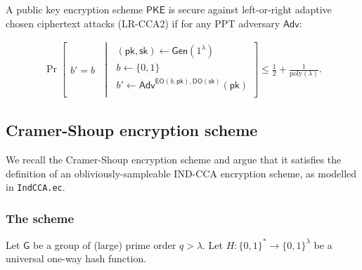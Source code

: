 \documentclass[11pt,letterpaper]{article}
\theoremstyle{plain} %
\theoremstyle{definition} %
\theoremstyle{remark} %
\newcommand{\code}[1]{\texttt{#1}} %
\newcommand{\SecParam}{\lambda}
\newcommand{\PKE}{\mathsf{PKE}}
\newcommand{\Gen}{\mathsf{Gen}}
\newcommand{\EncKey}{\mathsf{pk}}
\newcommand{\DecKey}{\mathsf{sk}}
\newcommand{\GuessBit}{b'}
\newcommand{\ChallengerBit}{b}
\newcommand{\EncOracle}{\mathsf{EO}}
\newcommand{\DecOracle}{\mathsf{DO}}
\newcommand{\Adversary}{{\mathsf{Adv}}} %
\newcommand{\pST}{\; \middle| \;}
\newcommand{\poly}{\mathrm{poly}}
\newcommand{\Bits}{\{0,1\}}
\newcommand{\Group}{\mathsf{G}}
\newcommand{\GrpOrd}{q}
\newcommand{\Hash}{H}
\begin{document}
A public key encryption scheme $\PKE$ is secure against left-or-right adaptive chosen ciphertext attacks (LR-CCA2) if for any PPT adversary $\Adversary$:

\begin{align*}
	\Pr \left[
	\begin{array}{c}
		\GuessBit = \ChallengerBit
	\end{array}
	\pST
	\begin{array}{r}
		(\EncKey, \DecKey) \gets \Gen(1^{\SecParam})\\
		\ChallengerBit \gets \Bits\\
		\GuessBit \gets \Adversary^{\EncOracle(\ChallengerBit,\EncKey), \DecOracle(\DecKey)}(\EncKey)\\
	\end{array}
	\right] \leq \frac{1}{2} + \frac{1}{\poly(\SecParam)}.
\end{align*}

\subsection{Cramer-Shoup encryption scheme}
\label{sec:cramer-shoup}
We recall the Cramer-Shoup encryption scheme \cite{CramerS98} and argue that it satisfies the definition of an obliviously-sampleable IND-CCA encryption scheme, as modelled in \code{IndCCA.ec}.

\subsubsection{The scheme}
\label{sec:cramer-shoup-scheme}

Let $\Group$ be a group of (large) prime order $\GrpOrd > \SecParam$. Let $\Hash \colon \Bits^{*} \to \Bits^{\SecParam}$ be a universal one-way hash function.
\end{document}
